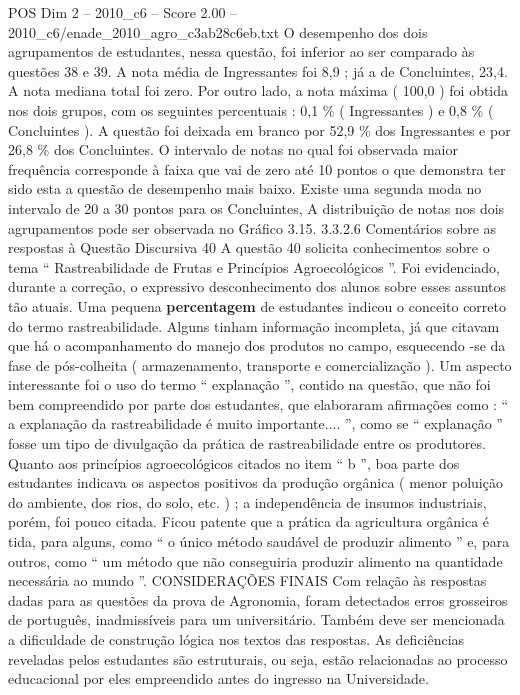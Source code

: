 \begin{textsample}{POS Dim 2 – 2010\_c6 – Score 2.00 – 2010\_c6/enade\_2010\_agro\_c3ab28c6eb.txt}
O desempenho dos dois agrupamentos de estudantes, nessa questão, foi inferior ao ser comparado às questões 38 e 39.
A nota média de Ingressantes foi 8,9 ; já a de Concluintes, 23,4.
A nota mediana total foi zero.
Por outro lado, a nota máxima ( 100,0 ) foi obtida nos dois grupos, com os seguintes percentuais : 0,1 \% ( Ingressantes ) e 0,8 \% ( Concluintes ).
A questão foi deixada em branco por 52,9 \% dos Ingressantes e por 26,8 \% dos Concluintes.
O intervalo de notas no qual foi observada maior frequência corresponde à faixa que vai de zero até 10 pontos o que demonstra ter sido esta a questão de desempenho mais baixo.
Existe uma segunda moda no intervalo de 20 a 30 pontos para os Concluintes, A distribuição de notas nos dois agrupamentos pode ser observada no Gráfico 3.15. 3.3.2.6 Comentários sobre as respostas à Questão Discursiva 40 A questão 40 solicita conhecimentos sobre o tema “ Rastreabilidade de Frutas e Princípios Agroecológicos ”.
Foi evidenciado, durante a correção, o expressivo desconhecimento dos alunos sobre esses assuntos tão atuais.
Uma pequena \textbf{percentagem} de estudantes indicou o conceito correto do termo rastreabilidade.
Alguns tinham informação incompleta, já que citavam que há o acompanhamento do manejo dos produtos no campo, esquecendo -se da fase de pós-colheita ( armazenamento, transporte e comercialização ).
Um aspecto interessante foi o uso do termo “ explanação ”, contido na questão, que não foi bem compreendido por parte dos estudantes, que elaboraram afirmações como : “ a explanação da rastreabilidade é muito importante.... ”, como se “ explanação ” fosse um tipo de divulgação da prática de rastreabilidade entre os produtores.
Quanto aos princípios agroecológicos citados no item “ b ”, boa parte dos estudantes indicava os aspectos positivos da produção orgânica ( menor poluição do ambiente, dos rios, do solo, etc. ) ; a independência de insumos industriais, porém, foi pouco citada.
Ficou patente que a prática da agricultura orgânica é tida, para alguns, como “ o único método saudável de produzir alimento ” e, para outros, como “ um método que não conseguiria produzir alimento na quantidade necessária ao mundo ”.
CONSIDERAÇÕES FINAIS Com relação às respostas dadas para as questões da prova de Agronomia, foram detectados erros grosseiros de português, inadmissíveis para um universitário.
Também deve ser mencionada a dificuldade de construção lógica nos textos das respostas.
As deficiências reveladas pelos estudantes são estruturais, ou seja, estão relacionadas ao processo educacional por eles empreendido antes do ingresso na Universidade.

\end{textsample}

